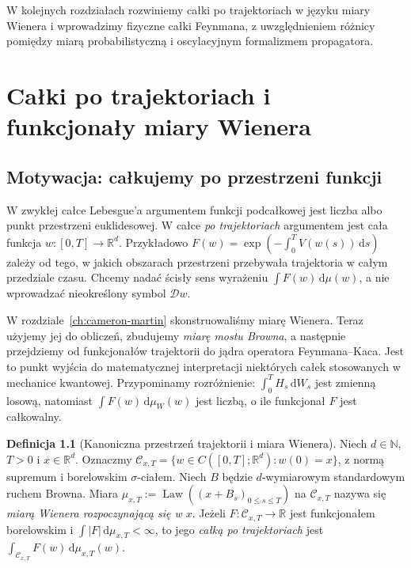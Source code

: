 \documentclass[11pt,a4paper,oneside]{report}
\numberwithin{equation}{chapter}
\theoremstyle{plain}
\theoremstyle{definition}
\newtheorem{definicja}{Definicja}[chapter]
\theoremstyle{remark}
\newcommand{\R}{\mathbb{R}}
\newcommand{\N}{\mathbb{N}}
\newcommand{\Law}{\operatorname{Law}}
\newcommand{\calC}{\mathcal{C}}
\newcommand{\dd}{\mathrm{d}}
\begin{document}
W kolejnych rozdziałach rozwiniemy całki po trajektoriach
w języku miary Wienera i wprowadzimy fizyczne całki
Feynmana, z uwzględnieniem różnicy pomiędzy miarą
probabilistyczną i oscylacyjnym formalizmem propagatora.




\chapter{Całki po trajektoriach i funkcjonały miary Wienera}
\label{ch:path-integrals}

\section{Motywacja: całkujemy po przestrzeni funkcji}

W zwykłej całce Lebesgue'a argumentem funkcji podcałkowej jest liczba
albo punkt przestrzeni euklidesowej. W całce \emph{po trajektoriach}
argumentem jest cała funkcja $w:[0,T]\to\R^d$. Przykładowo
$F(w)=\exp(-\int_0^T V(w(s))\,\dd s)$ zależy od tego, w jakich
obszarach przestrzeni przebywała trajektoria w całym przedziale czasu.
Chcemy nadać ścisły sens wyrażeniu $\int F(w)\,\dd\mu(w)$, a nie
wprowadzać nieokreślony symbol $\mathcal D w$.

W rozdziale~\ref{ch:cameron-martin} skonstruowaliśmy miarę Wienera.
Teraz użyjemy jej do obliczeń, zbudujemy \emph{miarę mostu Browna},
a następnie przejdziemy od funkcjonałów trajektorii do jądra
operatora Feynmana--Kaca. Jest to punkt wyjścia do matematycznej
interpretacji niektórych całek stosowanych w mechanice kwantowej.
Przypominamy rozróżnienie: $\int_0^T H_s\,\dd W_s$ jest zmienną
losową, natomiast $\int F(w)\,\dd\mu_W(w)$ jest liczbą, o ile
funkcjonał $F$ jest całkowalny.

\begin{definicja}[Kanoniczna przestrzeń trajektorii i miara Wienera]
\label{def:path-wiener}
Niech $d\in\N$, $T>0$ i $x\in\R^d$. Oznaczmy
$\calC_{x,T}=\{w\in C([0,T];\R^d):w(0)=x\}$, z normą
supremum i borelowskim $\sigma$-ciałem. Niech $B$ będzie
$d$-wymiarowym standardowym ruchem Browna. Miara
$\mu_{x,T}:=\Law((x+B_s)_{0\le s\le T})$ na $\calC_{x,T}$
nazywa się \emph{miarą Wienera rozpoczynającą się w $x$}.
Jeżeli $F:\calC_{x,T}\to\R$ jest funkcjonałem borelowskim
i $\int|F|\,\dd\mu_{x,T}<\infty$, to jego \emph{całką
po trajektoriach} jest $\int_{\calC_{x,T}}F(w)\,\dd\mu_{x,T}(w)$.
\end{definicja}
\end{document}
